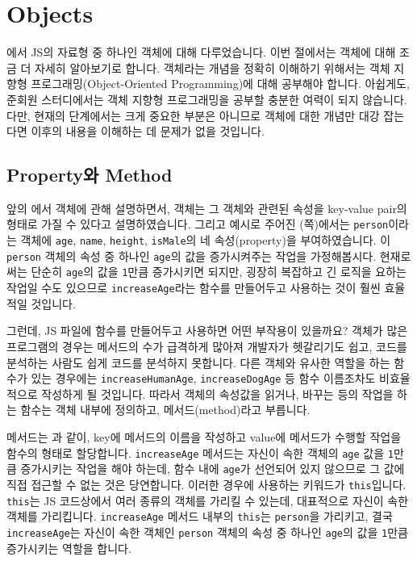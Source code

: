 \section{Objects} \label{sect:objects}

에서 JS의 자료형 중 하나인 객체에 대해 다루었습니다. 이번 절에서는 객체에 대해 조금 더 자세히 알아보기로 합니다. 객체라는 개념을 정확히 이해하기 위해서는 객체 지향형 프로그래밍(Object-Oriented Programming)에 대해 공부해야 합니다. 아쉽게도, 준회원 스터디에서는 객체 지향형 프로그래밍을 공부할 충분한 여력이 되지 않습니다. 다만, 현재의 단계에서는 크게 중요한 부분은 아니므로 객체에 대한 개념만 대강 잡는다면 이후의 내용을 이해하는 데 문제가 없을 것입니다. 

\subsection*{Property와 Method}

앞의 에서 객체에 관해 설명하면서, 객체는 그 객체와 관련된 속성을 key-value pair의 형태로 가질 수 있다고 설명하였습니다. 그리고 예시로 주어진 (\pageref{code:object-type}쪽)에서는 \texttt{person}이라는 객체에 \texttt{age}, \texttt{name}, \texttt{height}, \texttt{isMale}의 네 속성(property)을 부여하였습니다. 이 \texttt{person} 객체의 속성 중 하나인 \texttt{age}의 값을 증가시켜주는 작업을 가정해봅시다. 현재로써는 단순히 \texttt{age}의 값을 \texttt{1}만큼 증가시키면 되지만, 굉장히 복잡하고 긴 로직을 요하는 작업일 수도 있으므로 \texttt{increaseAge}라는 함수를 만들어두고 사용하는 것이 훨씬 효율적일 것입니다. 

그런데, JS 파일에 함수를 만들어두고 사용하면 어떤 부작용이 있을까요? 객체가 많은 프로그램의 경우는 메서드의 수가 급격하게 많아져 개발자가 헷갈리기도 쉽고, 코드를 분석하는 사람도 쉽게 코드를 분석하지 못합니다. 다른 객체와 유사한 역할을 하는 함수가 있는 경우에는 \texttt{increaseHumanAge}, \texttt{increaseDogAge} 등 함수 이름조차도 비효율적으로 작성하게 될 것입니다. 따라서 객체의 속성값을 읽거나, 바꾸는 등의 작업을 하는 함수는 객체 내부에 정의하고, 메서드(method)라고 부릅니다. 

메서드는 과 같이, key에 메서드의 이름을 작성하고 value에 메서드가 수행할 작업을 함수의 형태로 할당합니다. \texttt{increaseAge} 메서드는 자신이 속한 객체의 \texttt{age} 값을 \texttt{1}만큼 증가시키는 작업을 해야 하는데, 함수 내에 \texttt{age}가 선언되어 있지 않으므로 그 값에 직접 접근할 수 없는 것은 당연합니다. 이러한 경우에 사용하는 키워드가 \texttt{this}입니다. \texttt{this}는 JS 코드상에서 여러 종류의 객체를 가리킬 수 있는데, 대표적으로 자신이 속한 객체를 가리킵니다. \texttt{increaseAge} 메서드 내부의 \texttt{this}는 \texttt{person}을 가리키고, 결국 \texttt{increaseAge}는 자신이 속한 객체인 \texttt{person} 객체의 속성 중 하나인 \texttt{age}의 값을 \texttt{1}만큼 증가시키는 역할을 합니다. 

